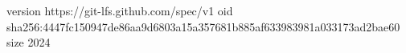 version https://git-lfs.github.com/spec/v1
oid sha256:4447fc150947de86aa9d6803a15a357681b885af633983981a033173ad2bae60
size 2024
